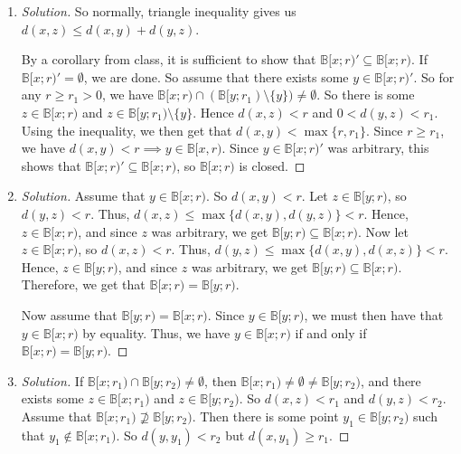 \documentclass{article}
\begin{document}
\begin{enumerate}
	\item \begin{proof}[Solution]\let\qed\relax
		So normally, triangle inequality gives us $d(x,z) \leq d(x,y) + d(y,z)$.
		
		By a corollary from class, it is sufficient to show that
		$\mathbb{B}[x;r)' \subseteq \mathbb{B}[x;r)$.
		If $\mathbb{B}[x;r)' = \emptyset$, we are done.
		So assume that there exists some $y \in \mathbb{B}[x;r)'$.
		So for any $r \geq r_1 > 0$, we have
		$\mathbb{B}[x;r) \cap (\mathbb{B}[y;r_1)\setminus\{y\}) \neq \emptyset$.
		So there is some $z \in \mathbb{B}[x;r)$ and $z \in \mathbb{B}[y;r_1) \setminus \{y\}$.
		Hence $d(x,z) < r$ and $0 < d(y,z) < r_1$.
		Using the inequality, we then get that $d(x,y) < \max\{r,r_1\}$.
		Since $r \geq r_1$, we have $d(x,y) < r \implies y \in \mathbb{B}[x,r)$.
		Since $y \in \mathbb{B}[x;r)'$ was arbitrary,
		this shows that $\mathbb{B}[x;r)' \subseteq \mathbb{B}[x;r)$,
		so $\mathbb{B}[x;r)$ is closed.
	\end{proof}
	\item \begin{proof}[Solution]\let\qed\relax
			Assume that $y \in \mathbb{B}[x;r)$.
			So $d(x,y) < r$.
			Let $z \in \mathbb{B}[y;r)$,
			so $d(y,z) < r$.
			Thus, $d(x,z) \leq \max\{d(x,y),d(y,z)\} < r$.
			Hence, $z \in \mathbb{B}[x;r)$,
			and since $z$ was arbitrary, we get $\mathbb{B}[y;r) \subseteq \mathbb{B}[x;r)$.
			Now let $z \in \mathbb{B}[x;r)$,
			so $d(x,z) < r$.
			Thus, $d(y,z) \leq \max\{d(x,y),d(x,z)\} < r$.
			Hence, $z \in \mathbb{B}[y;r)$,
			and since $z$ was arbitrary, we get $\mathbb{B}[y;r) \subseteq \mathbb{B}[x;r)$.
			Therefore, we get that $\mathbb{B}[x;r) = \mathbb{B}[y;r)$.

			Now assume that $\mathbb{B}[y;r) = \mathbb{B}[x;r)$.
			Since $y \in \mathbb{B}[y;r)$, we must then have that
			$y \in \mathbb{B}[x;r)$ by equality.
			Thus, we have $y \in \mathbb{B}[x;r)$ if and
			only if $\mathbb{B}[x;r) = \mathbb{B}[y;r)$.
	\end{proof}
	\item \begin{proof}[Solution]\let\qed\relax
			If $\mathbb{B}[x;r_1) \cap \mathbb{B}[y;r_2) \neq \emptyset$,
			then $\mathbb{B}[x;r_1) \neq \emptyset \neq \mathbb{B}[y;r_2)$,
			and there exists some $z \in \mathbb{B}[x;r_1)$
			and $z \in \mathbb{B}[y;r_2)$.
			So $d(x,z) < r_1$ and $d(y,z) < r_2$.
			Assume that $\mathbb{B}[x;r_1) \not\supseteq \mathbb{B}[y;r_2)$.
			Then there is some point $y_1 \in \mathbb{B}[y;r_2)$ such that
			$y_1 \not\in \mathbb{B}[x;r_1)$.
			So $d(y,y_1) < r_2$ but $d(x,y_1) \geq r_1$.


\end{proof}
\end{enumerate}
\end{document}
